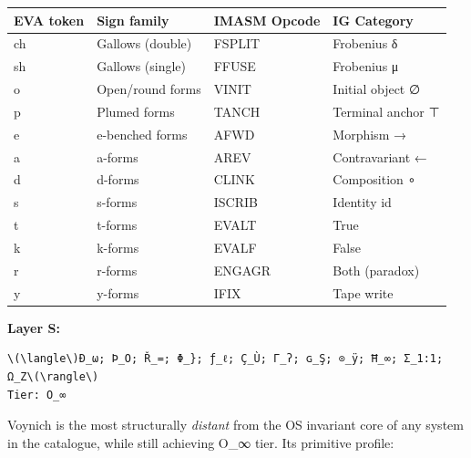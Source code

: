 \documentclass[
  11pt,
  a4paper,
]{article}
\newcounter{none} %
\begin{document}
{\def\LTcaptype{none} %
\begin{longtable}[]{@{}llll@{}}
\toprule\noalign{}
EVA token & Sign family & IMASM Opcode & IG Category \\
\midrule\noalign{}
\endhead
\bottomrule\noalign{}
\endlastfoot
ch & Gallows (double) & FSPLIT & Frobenius δ \\
sh & Gallows (single) & FFUSE & Frobenius μ \\
o & Open/round forms & VINIT & Initial object ∅ \\
p & Plumed forms & TANCH & Terminal anchor ⊤ \\
e & e-benched forms & AFWD & Morphism → \\
a & a-forms & AREV & Contravariant ← \\
d & d-forms & CLINK & Composition ∘ \\
s & s-forms & ISCRIB & Identity id \\
t & t-forms & EVALT & True \\
k & k-forms & EVALF & False \\
r & r-forms & ENGAGR & Both (paradox) \\
y & y-forms & IFIX & Tape write \\
\end{longtable}
}

\textbf{Layer S:}

\begin{verbatim}
\(\langle\)Ð_ω; Þ_O; Ř_=; Φ_}; ƒ_ℓ; Ç_Ù; Γ_ʔ; ɢ_Ş; ⊙_ÿ; Ħ_∞; Σ_1:1; Ω_Z\(\rangle\)
Tier: O_∞
\end{verbatim}

Voynich is the most structurally \emph{distant} from the OS invariant
core of any system in the catalogue, while still achieving O\_∞ tier.
Its primitive profile:
\end{document}
